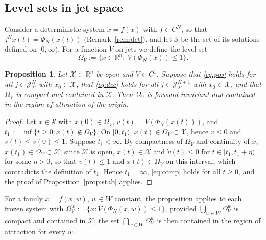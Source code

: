 \documentclass[preprint,12pt,authoryear]{elsarticle}
\newtheorem{proposition}[theorem]{Proposition}
\theoremstyle{definition}
\theoremstyle{remark}
\newcommand{\R}{\mathbb{R}}
\newcommand{\Jet}{\mathcal{J}}
\newcommand{\Sol}{\mathcal{S}}
\begin{document}
\subsection{Level sets in jet space}
Consider a deterministic system $\dot x=f(x)$ with $f\in C^N$, so that $j^Nx(t)=\Phi_N(x(t))$ (Remark~\ref{rem:det}), and let $\Sol$ be the set of its solutions defined on $[0,\infty)$. For a function $V$ on jets we define the level set
\begin{equation}\label{eq:Omega}
\Omega_V:=\big\{x\in\R^n:\ V(\Phi_N(x))\le1\big\}.
\end{equation}
\begin{proposition}\label{prop:regional}
Let $\mathcal X\subset\R^n$ be open and $V\in C^1$. Suppose that \eqref{eq:pos} holds for all $j\in\Jet^N_\Sigma$ with $x_0\in\mathcal X$, that \eqref{eq:dec} holds for all $\bar j\in\Jet^{N+1}_\Sigma$ with $x_0\in\mathcal X$, and that $\Omega_V$ is compact and contained in $\mathcal X$. Then $\Omega_V$ is forward invariant and contained in the region of attraction of the origin.
\end{proposition}
\begin{proof}
Let $x\in\Sol$ with $x(0)\in\Omega_V$, $v(t)=V(\Phi_N(x(t)))$, and $t_1:=\inf\{t\ge0:x(t)\notin\Omega_V\}$. On $[0,t_1)$, $x(t)\in\Omega_V\subset\mathcal X$, hence $\dot v\le0$ and $v(t)\le v(0)\le1$. Suppose $t_1<\infty$. By compactness of $\Omega_V$ and continuity of $x$, $x(t_1)\in\Omega_V\subset\mathcal X$; since $\mathcal X$ is open, $x(t)\in\mathcal X$ and $\dot v(t)\le0$ for $t\in[t_1,t_1+\eta)$ for some $\eta>0$, so that $v(t)\le1$ and $x(t)\in\Omega_V$ on this interval, which contradicts the definition of $t_1$. Hence $t_1=\infty$, \eqref{eq:comp} holds for all $t\ge0$, and the proof of Proposition~\ref{prop:stab} applies.
\end{proof}
For a family $\dot x=f(x,w)$, $w\in W$ constant, the proposition applies to each frozen system with $\Omega^w_V:=\{x:V(\Phi_N(x,w))\le1\}$, provided $\bigcup_{w\in W}\Omega^w_V$ is compact and contained in $\mathcal X$; the set $\bigcap_{w\in W}\Omega^w_V$ is then contained in the region of attraction for every $w$.
\end{document}

